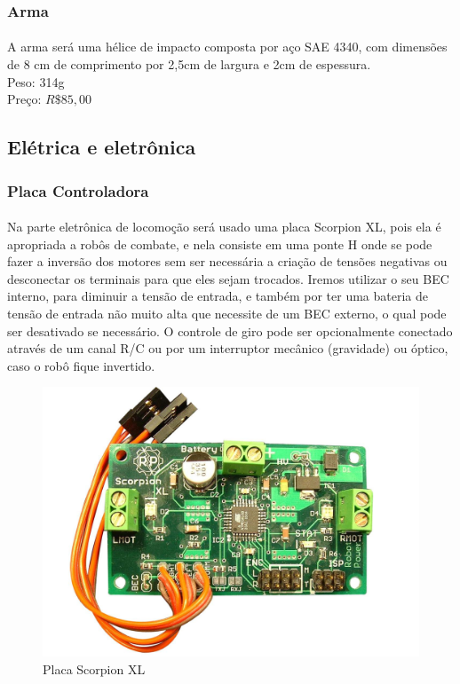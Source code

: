 \documentclass{article}
\begin{document}
            \subsubsection{Arma}
                \paragraph{}
                A arma será uma hélice de impacto composta por aço SAE 4340, com dimensões de 8 cm de comprimento por 2,5cm de largura e 2cm de espessura.
                \\
                Peso: 314g\\
                Preço: $R\$85,00$


        \subsection{Elétrica e eletrônica}
            \subsubsection{Placa Controladora}
                \paragraph{}
                Na parte eletrônica de locomoção será usado uma placa Scorpion XL, pois ela é apropriada a robôs de combate, e nela consiste em uma ponte H onde se pode fazer a inversão dos motores sem ser necessária a criação de tensões negativas ou desconectar os terminais para que eles sejam trocados. Iremos utilizar o seu BEC interno, para diminuir a tensão de entrada, e também por ter uma bateria de tensão de entrada não muito alta que necessite de um BEC externo, o qual pode ser desativado se necessário. O controle de giro pode ser opcionalmente conectado através de um canal R/C ou por um interruptor mecânico (gravidade) ou óptico, caso o robô fique invertido.

                \begin{figure}[H]
                \includegraphics[width=\textwidth]{images/image00.jpg}
                \caption{Placa Scorpion XL}
                \centering
                \end{figure}
\end{document}
